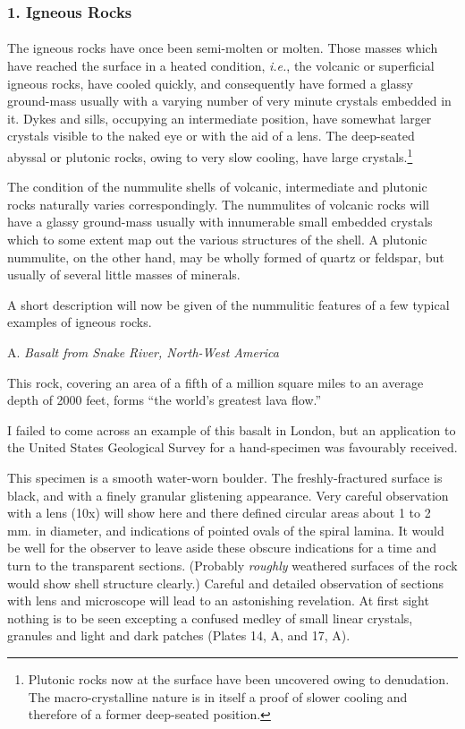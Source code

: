 \documentclass[a4paper, 12pt, oneside, landscape]{article}
\begin{document}
\subsubsection{1. Igneous Rocks}
\paragraph{}
The igneous rocks have once been semi-molten or molten. Those masses which have reached the surface in a heated condition, \emph{i.e.}, the volcanic or superficial igneous rocks, have cooled quickly, and consequently have formed a glassy ground-mass usually with a varying number of very minute crystals embedded in it. Dykes and sills, occupying an intermediate position, have somewhat larger crystals visible to the naked eye or with the aid of a lens. The deep-seated abyssal or plutonic rocks, owing to very slow cooling, have large crystals.\footnote{Plutonic rocks now at the surface have been uncovered owing to denudation. The macro-crystalline nature is in itself a proof of slower cooling and therefore of a former deep-seated position.}

The condition of the nummulite shells of volcanic, intermediate and plutonic rocks naturally varies correspondingly. The nummulites of volcanic rocks will have a glassy ground-mass usually with innumerable small embedded crystals which to some extent map out the various structures of the shell. A plutonic nummulite, on the other hand, may be wholly formed of quartz or feldspar, but usually of several little masses of minerals.

A short description will now be given of the nummulitic features of a few typical examples of igneous rocks.

\bigskip
\centerline{A. \emph{Basalt from Snake River, North-West America}}

This rock, covering an area of a fifth of a million square miles to an average depth of 2000 feet, forms ``the world's greatest lava flow.''

I failed to come across an example of this basalt in London, but an application to the United States Geological Survey for a hand-specimen was favourably received.

This specimen is a smooth water-worn boulder. The freshly-fractured surface is black, and with a finely granular glistening appearance. Very careful observation with a lens (10x) will show here and there defined circular areas about 1 to 2 mm. in diameter, and indications of pointed ovals of the spiral lamina. It would be well for the observer to leave aside these obscure indications for a time and turn to the transparent sections. (Probably \emph{roughly} weathered surfaces of the rock would show shell structure clearly.) Careful and detailed observation of sections with lens and microscope will lead to an astonishing revelation. At first sight nothing is to be seen excepting a confused medley of small linear crystals, granules and light and dark patches (Plates 14, A, and 17, A).
\end{document}
